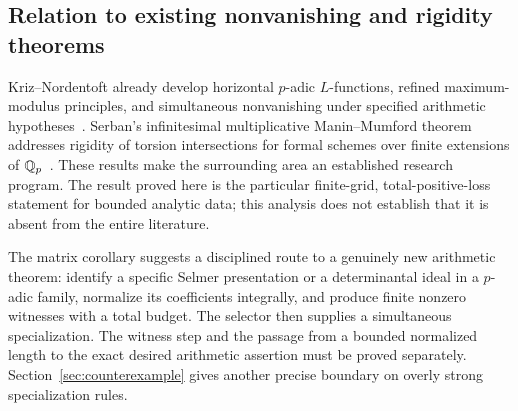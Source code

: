 \subsection{Relation to existing nonvanishing and rigidity theorems}

Kriz--Nordentoft already develop horizontal \(p\)-adic \(L\)-functions,
refined maximum-modulus principles, and simultaneous nonvanishing under
specified arithmetic hypotheses~\cite{kn}. Serban's infinitesimal
multiplicative Manin--Mumford theorem addresses rigidity of torsion
intersections for formal schemes over finite extensions of
\(\mathbb Q_p\)~\cite{serban}. These results make the surrounding area an
established research program. The result proved here is the particular
finite-grid, total-positive-loss statement for bounded analytic data;
this analysis does not establish that it is absent from the entire
literature.

The matrix corollary suggests a disciplined route to a genuinely new
arithmetic theorem: identify a specific Selmer presentation or a
determinantal ideal in a \(p\)-adic family, normalize its coefficients
integrally, and produce finite nonzero witnesses with a total budget.
The selector then supplies a simultaneous specialization. The witness
step and the passage from a bounded normalized length to the exact
desired arithmetic assertion must be proved separately.
Section~\ref{sec:counterexample} gives another precise boundary on
overly strong specialization rules.

